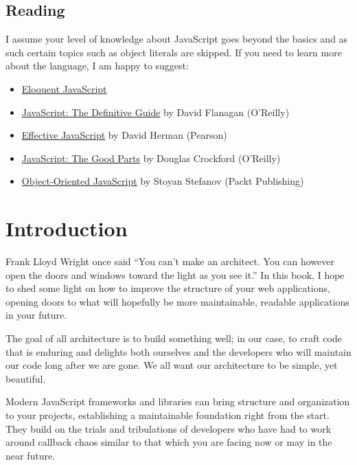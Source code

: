 \documentclass[9pt]{book}
\begin{document}
\subsection{Reading}\label{reading}

I assume your level of knowledge about JavaScript goes beyond the basics
and as such certain topics such as object literals are skipped. If you
need to learn more about the language, I am happy to suggest:

\begin{itemize}
\itemsep1pt\parskip0pt
\item
  \href{http://eloquentjavascript.net/}{Eloquent JavaScript}
\item
  \href{http://shop.oreilly.com/product/9780596805531.do}{JavaScript:
  The Definitive Guide} by David Flanagan (O'Reilly)
\item
  \href{http://www.informit.com/store/effective-javascript-68-specific-ways-to-harness-the-9780321812186}{Effective
  JavaScript} by David Herman (Pearson)
\item
  \href{http://shop.oreilly.com/product/9780596517748.do}{JavaScript:
  The Good Parts} by Douglas Crockford (O'Reilly)
\item
  \href{http://www.amazon.com/Object-Oriented-Javascript-Stoyan-Stefanov/dp/1847194141}{Object-Oriented
  JavaScript} by Stoyan Stefanov (Packt Publishing)
\end{itemize}

\section{Introduction}\label{introduction}

Frank Lloyd Wright once said ``You can't make an architect. You can
however open the doors and windows toward the light as you see it.'' In
this book, I hope to shed some light on how to improve the structure of
your web applications, opening doors to what will hopefully be more
maintainable, readable applications in your future.

The goal of all architecture is to build something well; in our case, to
craft code that is enduring and delights both ourselves and the
developers who will maintain our code long after we are gone. We all
want our architecture to be simple, yet beautiful.

Modern JavaScript frameworks and libraries can bring structure and
organization to your projects, establishing a maintainable foundation
right from the start. They build on the trials and tribulations of
developers who have had to work around callback chaos similar to that
which you are facing now or may in the near future.
\end{document}

